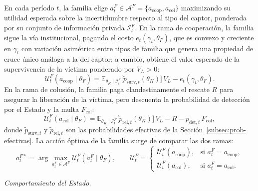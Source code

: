 \documentclass[review,authoryear,12pt]{elsarticle}
\theoremstyle{plain}
\theoremstyle{definition}
\newcommand{\E}{\mathbb{E}}
\newcommand{\1}{\mathbf{1}}
\begin{document}
\noindent En cada período $t$, la familia elige $a_t^F\in\mathcal{A}^F=\{a_{\mathrm{coop}},a_{\mathrm{col}}\}$ maximizando su utilidad esperada sobre la incertidumbre respecto al tipo del captor, ponderada por su conjunto de información privada $\mathcal{I}_t^F$. En la rama de cooperación, la familia sigue la vía institucional, pagando el costo $e_t(\gamma_t,\theta_F)$, que es convexo y creciente en $\gamma_t$ con variación asimétrica entre tipos de familia que genera una propiedad de cruce único análoga a la del captor; a cambio, obtiene el valor esperado de la supervivencia de la víctima ponderado por $V_L>0$:
\begin{equation}
\mathcal{U}^F_t(a_{\mathrm{coop}}\mid\theta_F)=\E_{\theta_K\mid\mathcal{I}_t^F}\!\bigl[\tilde{p}_{\mathrm{surv},t}(\theta_K)\bigr]\,V_L-e_t(\gamma_t,\theta_F).
\label{eq:f-coop}
\end{equation}
En la rama de colusión, la familia paga clandestinamente el rescate $R$ para asegurar la liberación de la víctima, pero descuenta la probabilidad de detección por el Estado y la multa $F_{\mathrm{col}}$:
\begin{equation}
\mathcal{U}^F_t(a_{\mathrm{col}}\mid\theta_F)=\E_{\theta_K\mid\mathcal{I}_t^F}\!\bigl[\tilde{p}_{\mathrm{rel},t}(\theta_K)\bigr]\,V_L-R-p_{\mathrm{det},t}\,F_{\mathrm{col}},
\label{eq:f-col}
\end{equation}
donde $\tilde{p}_{\mathrm{surv},t}$ y $\tilde{p}_{\mathrm{rel},t}$ son las probabilidades efectivas de la Sección~\ref{subsec:prob-efectivas}. La acción óptima de la familia surge de comparar las dos ramas:
\begin{equation}
a_t^{F\ast}=\arg\max_{a_t^F\in\mathcal{A}^F}\mathcal{U}^F_t(a_t^F\mid\theta_F),\qquad
\mathcal{U}^F_t=\begin{cases}\mathcal{U}^F_t(a_{\mathrm{coop}}), & \text{si }a_t^F=a_{\mathrm{coop}},\\\mathcal{U}^F_t(a_{\mathrm{col}}), & \text{si }a_t^F=a_{\mathrm{col}}.\end{cases}
\label{eq:f-argmax}
\end{equation}

\noindent\textit{Comportamiento del Estado.}
\end{document}

